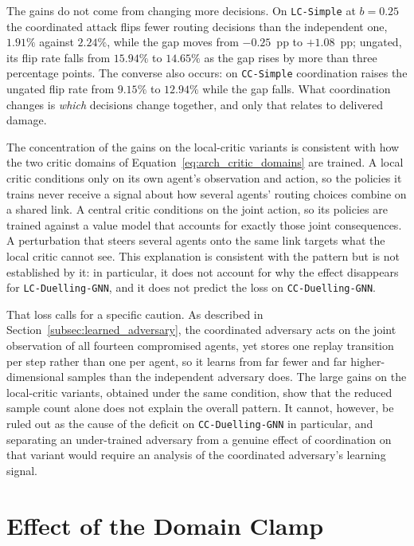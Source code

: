 The gains do not come from changing more decisions. On \texttt{LC-Simple} at $b = 0.25$
the coordinated attack flips fewer routing decisions than the independent one, $1.91\%$
against $2.24\%$, while the gap moves from $-0.25$~pp to $+1.08$~pp; ungated, its flip
rate falls from $15.94\%$ to $14.65\%$ as the gap rises by more than three percentage
points. The converse also occurs: on \texttt{CC-Simple} coordination raises the ungated
flip rate from $9.15\%$ to $12.94\%$ while the gap falls. What coordination changes is
\emph{which} decisions change together, and only that relates to delivered damage.

The concentration of the gains on the local-critic variants is consistent with how the
two critic domains of Equation~\eqref{eq:arch_critic_domains} are trained. A local
critic conditions only on its own agent's observation and action, so the policies it
trains never receive a signal about how several agents' routing choices combine on a
shared link. A central critic conditions on the joint action, so its policies are
trained against a value model that accounts for exactly those joint consequences. A
perturbation that steers several agents onto the same link targets what the local
critic cannot see. This explanation is consistent with the pattern but is not
established by it: in particular, it does not account for why the effect disappears
for \texttt{LC-Duelling-GNN}, and it does not predict the loss on
\texttt{CC-Duelling-GNN}.

That loss calls for a specific caution. As described in
Section~\ref{subsec:learned_adversary}, the coordinated adversary acts on the joint
observation of all fourteen compromised agents, yet stores one replay transition per
step rather than one per agent, so it learns from far fewer and far higher-dimensional
samples than the independent adversary does. The large gains on the local-critic
variants, obtained under the same condition, show that the reduced sample count alone
does not explain the overall pattern. It cannot, however, be ruled out as the cause of
the deficit on \texttt{CC-Duelling-GNN} in particular, and separating an under-trained
adversary from a genuine effect of coordination on that variant would require an
analysis of the coordinated adversary's learning signal.

\section{Effect of the Domain Clamp}
\label{sec:results_clamp_effect}

